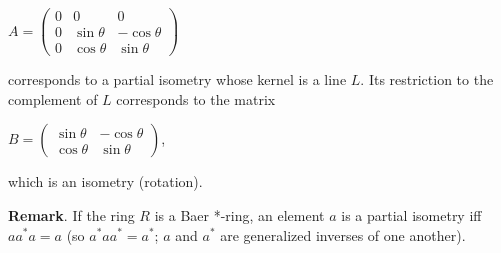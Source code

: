 \documentclass[12pt]{article}
\begin{document}
\begin{center}$A =
\begin{pmatrix}
0 & 0 & 0 \\
0 & \sin\theta & -\cos\theta \\
0 & \cos\theta & \sin\theta
\end{pmatrix}$
\end{center}

corresponds to a partial isometry whose kernel is a line $L$.  Its restriction to the complement of $L$ corresponds to the matrix

\begin{center}$B =
\begin{pmatrix}
\sin\theta & -\cos\theta \\
\cos\theta & \sin\theta
\end{pmatrix}$,
\end{center}

which is an isometry (rotation).

\textbf{Remark}.  If the ring $R$ is a Baer *-ring, an element $a$ is a partial isometry iff $aa^*a=a$ (so $a^*aa^*=a^*$; $a$ and $a^*$ are generalized inverses of one another).
\end{document}
